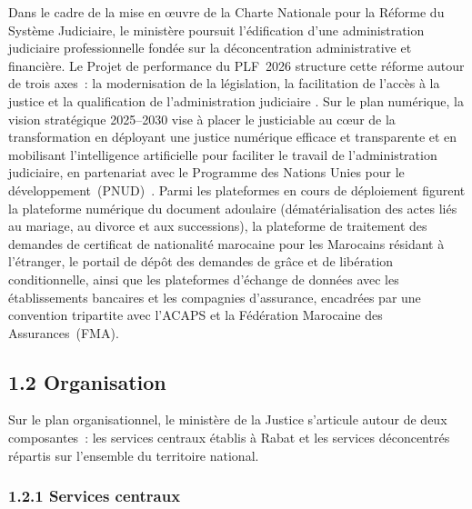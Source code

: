 Dans le cadre de la mise en \oe{}uvre de la Charte Nationale pour la Réforme du Système Judiciaire, le ministère poursuit l’édification d’une administration judiciaire professionnelle fondée sur la déconcentration administrative et financière. Le Projet de performance du PLF~2026 structure cette réforme autour de trois axes~: la modernisation de la législation, la facilitation de l’accès à la justice et la qualification de l’administration judiciaire \citep{MJNumerique2026}. Sur le plan numérique, la vision stratégique 2025--2030 vise à placer le justiciable au c\oe{}ur de la transformation en déployant une justice numérique efficace et transparente et en mobilisant l’intelligence artificielle pour faciliter le travail de l’administration judiciaire, en partenariat avec le Programme des Nations Unies pour le développement~(PNUD)~\citep{Ouajdouni2020}. Parmi les plateformes en cours de déploiement figurent la plateforme numérique du document adoulaire (dématérialisation des actes liés au mariage, au divorce et aux successions), la plateforme de traitement des demandes de certificat de nationalité marocaine pour les Marocains résidant à l’étranger, le portail de dépôt des demandes de grâce et de libération conditionnelle, ainsi que les plateformes d’échange de données avec les établissements bancaires et les compagnies d’assurance, encadrées par une convention tripartite avec l’ACAPS et la Fédération Marocaine des Assurances~(FMA).



\subsection*{1.2 \quad Organisation}

Sur le plan organisationnel, le minist\`ere de la Justice s'articule autour de deux composantes~: les services centraux \'etablis \`a Rabat et les services d\'econcentr\'es r\'epartis sur l'ensemble du territoire national.

\subsubsection*{1.2.1 \quad Services centraux}

